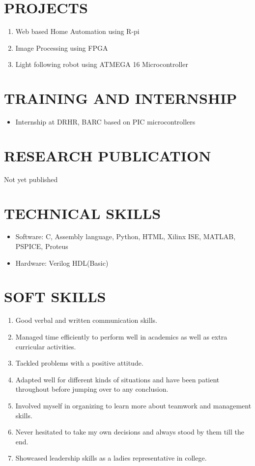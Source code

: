 \documentclass[line, margin]{res}
\begin{document}
\begin{resume}
\section{\bf PROJECTS}
\begin{enumerate}
	\item Web based Home Automation using R-pi
	\item Image Processing using FPGA
	\item Light following robot using ATMEGA 16 Microcontroller
\end{enumerate}

\section{\bf TRAINING AND INTERNSHIP} 
\begin{itemize}
	\item Internship at DRHR, BARC based on PIC microcontrollers 
\end{itemize}

\vspace{2mm}

\section{\bf RESEARCH PUBLICATION} 
Not yet published 

\vspace{2mm}

\section{\bf TECHNICAL SKILLS}
\begin{itemize}
	\item Software:  C, Assembly language, Python, HTML, Xilinx ISE, MATLAB, PSPICE, Proteus
	\item Hardware: Verilog HDL(Basic)
\end{itemize}

\section{\bf SOFT SKILLS}
\begin{enumerate}
	\item Good verbal and written communication skills.
	\item Managed time efficiently to perform well in academics as well as extra curricular activities.
	\item Tackled problems with a positive attitude.
	\item Adapted well for different kinds of situations and have been patient throughout before jumping over to any conclusion.
	\item Involved myself in organizing to learn more about teamwork and management skills.
	\item Never hesitated to take my own decisions and always stood by them till the end.
	\item Showcased leadership skills as a ladies representative in college.
\end{enumerate}


\end{resume}
\end{document}
